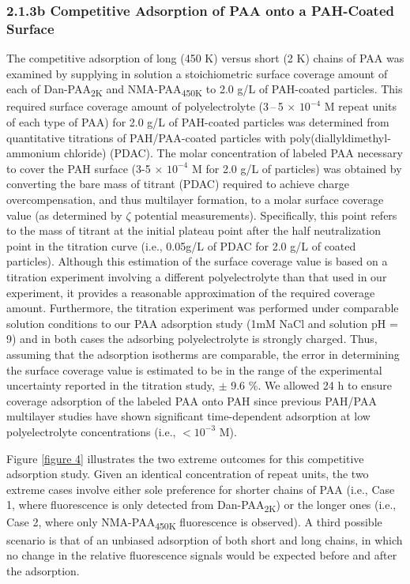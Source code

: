 \documentclass[journal=mamobx,manuscript=article]{achemso}
\begin{document}
\subsubsection{2.1.3b Competitive Adsorption of PAA onto a PAH-Coated Surface}    %
    \label{sec-exp-compet}

The competitive adsorption of long (450 K) versus short (2 K) chains of PAA was examined by supplying in solution a stoichiometric surface coverage amount of each of Dan-PAA\textsubscript{2K} and NMA-PAA\textsubscript{450K} to 2.0 g/L of PAH-coated particles.  This required surface coverage amount of polyelectrolyte (3\,--\,5$\,\times \,10^{-4}$ M repeat units of each type of PAA) for 2.0 g/L of PAH-coated particles was determined from quantitative titrations of PAH/PAA-coated particles with poly(diallyldimethyl-ammonium chloride) (PDAC).\cite{Burke2003}   The molar concentration of labeled PAA necessary to cover the PAH surface (3-5 $\times$ $10^{-4}$ M for 2.0 g/L of particles) was obtained by converting the bare mass of titrant (PDAC) required to achieve charge overcompensation, and thus multilayer formation, to a molar surface coverage value (as determined by $\zeta$ potential measurements).\cite{Burke2003}   Specifically, this point refers to the mass of titrant at the initial plateau point after the half neutralization point in the titration curve (i.e., 0.05g/L of PDAC for 2.0 g/L of coated particles).  Although this estimation of the surface coverage value is based on a titration experiment involving a different polyelectrolyte than that used in our experiment, it provides a reasonable approximation of the required coverage amount.  Furthermore, the titration experiment was performed under comparable solution conditions to our PAA adsorption study (1mM NaCl and solution pH = 9) and in both cases the adsorbing polyelectrolyte is strongly charged.  Thus, assuming that the adsorption isotherms are comparable, the error in determining the surface coverage value is estimated to be in the range of the experimental uncertainty reported in the titration study, $\pm$ 9.6 \%.  We allowed 24 h to ensure coverage adsorption of the labeled PAA onto PAH since previous PAH/PAA multilayer studies have shown significant time-dependent adsorption at low polyelectrolyte concentrations (i.e., $<10^{-3}$ M).\cite{Mermut2003}

Figure \ref{figure 4} illustrates the two extreme outcomes for this competitive adsorption study.  Given an identical concentration of repeat units, the two extreme cases involve either sole preference for shorter chains of PAA (i.e., Case 1, where fluorescence is only detected from Dan-PAA\textsubscript{2K}) or the longer ones (i.e., Case 2, where only NMA-PAA\textsubscript{450K} fluorescence is observed).  A third possible scenario is that of an unbiased adsorption of both short and long chains, in which no change in the relative fluorescence signals would be expected before and after the adsorption. 
\end{document}
